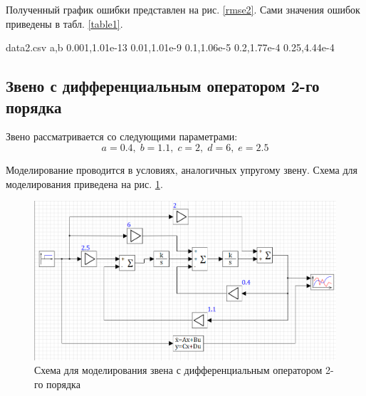 	Полученный график ошибки представлен на рис. \ref{rmse2}. Сами значения ошибок приведены в табл. \ref{table1}.
	
	\begin{filecontents*}{data2.csv}
		a,b
		0.001,1.01e-13
		0.01,1.01e-9
		0.1,1.06e-5
		0.2,1.77e-4
		0.25,4.44e-4
	\end{filecontents*}
	
	\begin{center}
		\label{rmse2}	
	\end{center}

	\subsection{Звено с дифференциальным оператором 2-го порядка}
	
	Звено рассматривается со следующими параметрами:
	\begin{equation*}
		a=0.4,\;b=1.1,\;c=2,\;d=6,\;e=2.5
	\end{equation*}
	
	Моделирование проводится в условиях, аналогичных упругому звену. Схема для моделирования приведена на рис. \ref{scheme3}.
	
	\begin{figure}[h]
		\centering\includegraphics[width=.7\textwidth]{png/scheme3.png}
		\caption{Схема для моделирования звена с дифференциальным оператором 2-го порядка}
		\label{scheme3}
	\end{figure}

